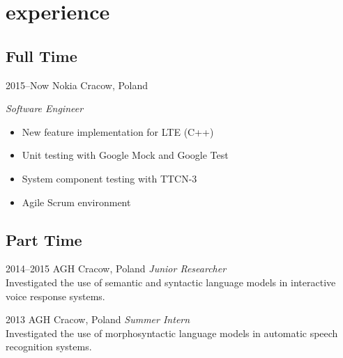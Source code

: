 \documentclass[]{friggeri-cv} %
\begin{document}

\section{experience}

\subsection{Full Time}

\begin{entrylist}


\entry
{2015--Now}
{Nokia}
{Cracow, Poland}
{\emph{Software Engineer} \\
  \begin{itemize}
  \item New feature implementation for LTE (C++)
  \item Unit testing with Google Mock and Google Test
  \item System component testing with TTCN-3
  \item Agile Scrum environment
  \end{itemize}
}


\end{entrylist}

\subsection{Part Time}

\begin{entrylist}

\entry
{2014--2015}
{AGH}
{Cracow, Poland}
{\emph{Junior Researcher} \\
  Investigated the use of semantic and syntactic language models in interactive voice response systems.}


\entry
{2013}
{AGH}
{Cracow, Poland}
{\emph{Summer Intern} \\
  Investigated the use of morphosyntactic language models in automatic speech recognition systems.}

\end{entrylist}
\end{document}
